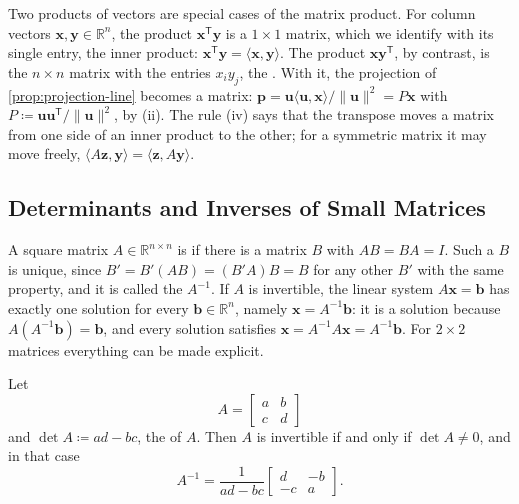Two products of vectors are special cases of the matrix product. For column vectors $\mathbf x,\mathbf y\in\mathbb R^n$, the product $\mathbf x^{\mathsf T}\mathbf y$ is a $1\times1$ matrix, which we identify with its single entry, the inner product: $\mathbf x^{\mathsf T}\mathbf y=\langle\mathbf x,\mathbf y\rangle$. The product $\mathbf x\mathbf y^{\mathsf T}$, by contrast, is the $n\times n$ matrix with the entries $x_iy_j$, the . With it, the projection of \cref{prop:projection-line} becomes a matrix: $\mathbf p=\mathbf u\langle\mathbf u,\mathbf x\rangle/\|\mathbf u\|^2=P\mathbf x$ with $P\coloneqq\mathbf u\mathbf u^{\mathsf T}/\|\mathbf u\|^2$, by (ii). The rule (iv) says that the transpose moves a matrix from one side of an inner product to the other; for a symmetric matrix it may move freely, $\langle A\mathbf z,\mathbf y\rangle=\langle\mathbf z,A\mathbf y\rangle$.

\subsection{Determinants and Inverses of Small Matrices}

A square matrix $A\in\mathbb R^{n\times n}$ is  if there is a matrix $B$ with $AB=BA=I$. Such a $B$ is unique, since $B'=B'(AB)=(B'A)B=B$ for any other $B'$ with the same property, and it is called the  $A^{-1}$. If $A$ is invertible, the linear system $A\mathbf x=\mathbf b$ has exactly one solution for every $\mathbf b\in\mathbb R^n$, namely $\mathbf x=A^{-1}\mathbf b$: it is a solution because $A(A^{-1}\mathbf b)=\mathbf b$, and every solution satisfies $\mathbf x=A^{-1}A\mathbf x=A^{-1}\mathbf b$. For $2\times2$ matrices everything can be made explicit.

\begin{proposition}
\label{prop:inverse-2x2}
Let
\[
A=\begin{bmatrix}a&b\\c&d\end{bmatrix}
\]
and $\det A\coloneqq ad-bc$, the  of $A$. Then $A$ is invertible if and only if $\det A\ne0$, and in that case
\[
A^{-1}=\frac1{ad-bc}\begin{bmatrix}d&-b\\-c&a\end{bmatrix}.
\]
\end{proposition}

